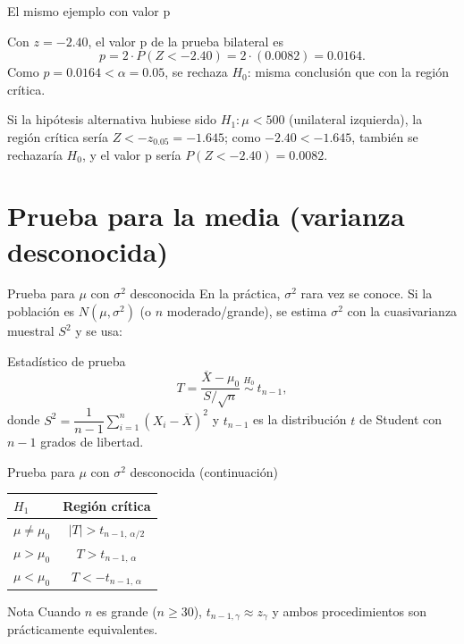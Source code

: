 \documentclass[aspectratio=169,11pt]{beamer}
\begin{document}
\begin{frame}{El mismo ejemplo con valor p}
\begin{example}
Con $z=-2.40$, el valor p de la prueba bilateral es
\[
p = 2\cdot P(Z<-2.40) = 2\cdot(0.0082) = 0.0164.
\]
Como $p=0.0164 < \alpha=0.05$, se rechaza $H_0$: misma conclusión que con la región crítica.

Si la hipótesis alternativa hubiese sido $H_1:\mu<500$ (unilateral izquierda), la región crítica sería $Z<-z_{0.05}=-1.645$; como $-2.40<-1.645$, también se rechazaría $H_0$, y el valor p sería $P(Z<-2.40)=0.0082$.
\end{example}
\end{frame}

\section{Prueba para la media (varianza desconocida)}

\begin{frame}{Prueba para $\mu$ con $\sigma^2$ desconocida}
En la práctica, $\sigma^2$ rara vez se conoce. Si la población es $N(\mu,\sigma^2)$ (o $n$ moderado/grande), se estima $\sigma^2$ con la cuasivarianza muestral $S^2$ y se usa:

\begin{block}{Estadístico de prueba}
\[
T = \frac{\overline{X}-\mu_0}{S/\sqrt{n}} \ \overset{H_0}{\sim}\ t_{n-1},
\]
donde $S^2=\dfrac{1}{n-1}\sum_{i=1}^n (X_i-\overline{X})^2$ y $t_{n-1}$ es la distribución $t$ de Student con $n-1$ grados de libertad.
\end{block}

\end{frame}

\begin{frame}{Prueba para $\mu$ con $\sigma^2$ desconocida (continuación)}
\begin{table}[]
\centering
\small
\begin{tabular}{@{}lc@{}}
\toprule
$H_1$ & Región crítica \\
\midrule
$\mu\neq\mu_0$ & $|T|>t_{n-1,\,\alpha/2}$ \\
$\mu>\mu_0$ & $T>t_{n-1,\,\alpha}$ \\
$\mu<\mu_0$ & $T<-t_{n-1,\,\alpha}$ \\
\bottomrule
\end{tabular}
\end{table}
\begin{alertblock}{Nota}
Cuando $n$ es grande ($n\ge30$), $t_{n-1,\gamma}\approx z_\gamma$ y ambos procedimientos son prácticamente equivalentes.
\end{alertblock}
\end{frame}
\end{document}
